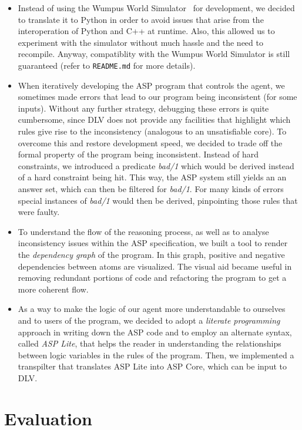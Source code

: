 \documentclass{llncs}
\begin{document}
\begin{itemize}
	\item Instead of using the Wumpus World Simulator~\cite{WWS} for development, we decided to translate it to Python in order to avoid issues that arise from the interoperation of Python and C++ at runtime. Also, this allowed us to experiment with the simulator without much hassle and the need to recompile. Anyway, compatiblity with the Wumpus World Simulator is still guaranteed (refer to \texttt{README.md} for more details).
	\item When iteratively developing the ASP program that controls the agent, we sometimes made errors that lead to our program being inconsistent (for some inputs).
	Without any further strategy, debugging these errors is quite cumbersome, since DLV does not provide any facilities that highlight which rules give rise to the inconsistency (analogous to an unsatisfiable core).
	To overcome this and restore development speed, we decided to trade off the formal property of the program being inconsistent.
	Instead of hard constraints, we introduced a predicate \emph{bad/1} which would be derived instead of a hard constraint being hit.
	This way, the ASP system still yields an an answer set, which can then be filtered for \emph{bad/1}.
	For many kinds of errors special instances of \emph{bad/1} would then be derived, pinpointing those rules that were faulty.
	\item To understand the flow of the reasoning process, as well as to analyse inconsistency issues within the ASP specification, we built a tool to render the \emph{dependency graph} of the program.
	In this graph, positive and negative dependencies between atoms are visualized.
	The visual aid became useful in removing redundant portions of code and refactoring the program to get a more coherent flow.
	\item As a way to make the logic of our agent more understandable to ourselves and to users of the program, we decided to adopt a \emph{literate programming} approach in writing down the ASP code and to employ an alternate syntax, called \emph{ASP Lite}, that helps the reader in understanding the relationships between logic variables in the rules of the program.
	Then, we implemented a transpilter that translates ASP Lite into ASP Core, which can be input to DLV.
\end{itemize}

\section{Evaluation}
\end{document}

